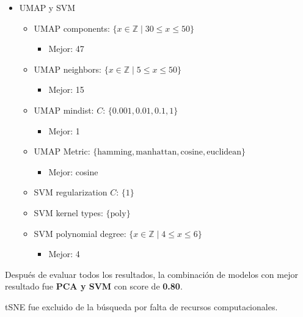 \documentclass[journal]{IEEEtran}
\begin{document}
\begin{otherlanguage}{english}
\begin{itemize}
        \item UMAP y SVM
        \begin{itemize}
                \item UMAP components: \( \{ x \in \mathbb{Z} \mid 30 \leq x \leq 50 \} \)
                \begin{itemize}
                        \item Mejor: 47
                \end{itemize}
                \item UMAP neighbors: \( \{ x \in \mathbb{Z} \mid 5 \leq x \leq 50 \} \)
                \begin{itemize}
                        \item Mejor: 15
                \end{itemize}
                \item UMAP mindist: \( C \): \( \{ 0.001, 0.01, 0.1, 1 \} \)
                \begin{itemize}
                        \item Mejor: 1
                \end{itemize}
                \item UMAP Metric: \( \{ \text{hamming}, \text{manhattan}, \text{cosine}, \allowbreak \text{euclidean} \} \)
                \begin{itemize}
                        \item Mejor: cosine
                \end{itemize}
                \item SVM regularization \( C \): \( \{ 1 \} \)
                \item SVM kernel types: \( \{ \text{poly} \} \)
                \item SVM polynomial degree: \( \{ x \in \mathbb{Z} \mid 4 \leq x \leq 6 \} \)
                \begin{itemize}
                        \item Mejor: 4
                \end{itemize}
        \end{itemize}
        
\end{itemize}
\end{otherlanguage}

Después de evaluar todos los resultados, la combinación de modelos con mejor resultado fue \textbf{PCA y SVM} con score de \textbf{0.80}.

tSNE fue excluido de la búsqueda por falta de recursos computacionales.
\end{document}
